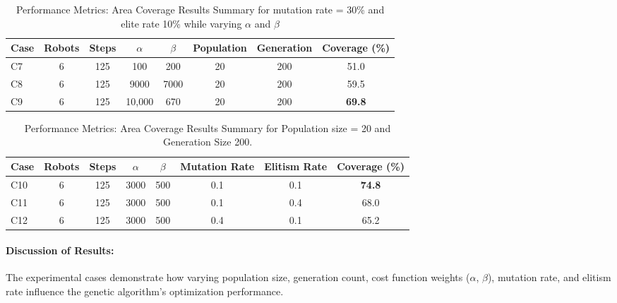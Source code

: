 \begin{table}[H]
\centering
\caption{Performance Metrics: Area Coverage Results Summary for mutation rate = 30\% and elite rate 10\% while varying $\alpha$ and $\beta$}
\begin{tabular}{@{}lccccccc@{}}
\toprule
\textbf{Case} & \textbf{Robots} & \textbf{Steps} & \textbf{$\alpha$} & \textbf{$\beta$} & \textbf{Population} & \textbf{Generation} & \textbf{Coverage (\%)} \\
\midrule
C7 & 6 & 125 & 100 & 200 & 20 & 200 & 51.0 \\
C8 & 6 & 125 & 9000 & 7000 & 20 & 200 & 59.5 \\
C9 & 6 & 125 & 10,000 & 670 & 20 & 200 & \textbf{69.8} \\
\bottomrule
\end{tabular}
\label{tab:ga_alpha_beta}
\end{table}

\begin{table}[H]
\centering
\caption{Performance Metrics: Area Coverage Results Summary for Population size = 20 and Generation Size 200.}
\begin{tabular}{@{}lccccccc@{}}
\toprule
\textbf{Case} & \textbf{Robots} & \textbf{Steps} & \textbf{$\alpha$} & \textbf{$\beta$} & \textbf{Mutation Rate} & \textbf{Elitism Rate} & \textbf{Coverage (\%)} \\
\midrule
C10 & 6 & 125 & 3000 & 500 & 0.1 & 0.1 & \textbf{74.8} \\
C11 & 6 & 125 & 3000 & 500 & 0.1 & 0.4 & 68.0 \\
C12 & 6 & 125 & 3000 & 500 & 0.4 & 0.1 & 65.2 \\
\bottomrule
\end{tabular}
\label{tab:ga_mut_elite}
\end{table}
\paragraph{Discussion of Results:}

The experimental cases demonstrate how varying population size, generation count, cost function weights ($\alpha$, $\beta$), mutation rate, and elitism rate influence the genetic algorithm's optimization performance.

